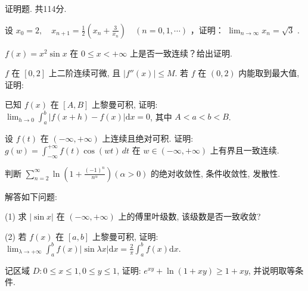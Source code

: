 \par{}
证明题. 共114分.\par
设  $x_{0}=2,\quad x_{n+1}=\frac{1}{2}\left(x_{n}+\frac{3}{x_{n}}\right)\quad(n=0,1,\cdots)$ ，证明： $\lim_{n\to\infty}x_{n}=\sqrt{3}$ .\par
$f(x) = x^{2}\sin x$ 在 $0 \leq x < +\infty$ 上是否一致连续？给出证明.\par
\par{}
$f$ 在 $[0,2]$ 上二阶连续可微, 且 $|f''(x)| \leq M$. 若 $f$ 在 $(0,2)$ 内能取到最大值, 证明:\par
\nopagebreak[4]
已知 $f(x)$ 在 $[A, B]$ 上黎曼可积, 证明: $\lim_{h \to 0} \int_{a}^{b} |f(x + h) - f(x)| \mathrm{d}x = 0$, 其中 $A < a < b < B$.\par
设 $f(t)$ 在 $(- \infty, + \infty)$ 上连续且绝对可积. 证明: $g(w) = \int_{-\infty}^{+\infty} f(t) \cos(wt) \, dt$ 在 $w \in (-\infty, + \infty)$ 上有界且一致连续.\par
判断 $\sum_{n=2}^{\infty} \ln \left(1 + \frac{(-1)^n}{n^\alpha}\right) (\alpha > 0)$ 的绝对收敛性, 条件收敛性, 发散性.\par
解答如下问题:\par
(1) 求 $|\sin x|$ 在 $(- \infty, + \infty)$ 上的傅里叶级数, 该级数是否一致收敛?\par
(2) 若 $f(x)$ 在 $[a, b]$ 上黎曼可积, 证明: $\lim_{\lambda \to +\infty} \int_{a}^{b} f(x) |\sin \lambda x| \mathrm{d}x = \frac{2}{\pi} \int_{a}^{b} f(x) \mathrm{d}x.$\par
记区域 $D: 0 \leq x \leq 1, 0 \leq y \leq 1$, 证明: $e^{xy} + \ln(1 + xy) \geq 1 + xy$, 并说明取等条件.\par
